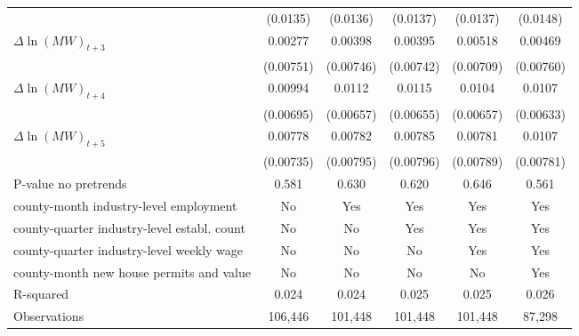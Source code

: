 {\begin{tabular}{l*{5}{c}}
          & (0.0135)         & (0.0136)         & (0.0137)         & (0.0137)         & (0.0148)         \\
[1em]
$\Delta \ln(MW)_{t+3}$&  0.00277         &  0.00398         &  0.00395         &  0.00518         &  0.00469         \\
          &(0.00751)         &(0.00746)         &(0.00742)         &(0.00709)         &(0.00760)         \\
[1em]
$\Delta \ln(MW)_{t+4}$&  0.00994         &   0.0112\sym{*}  &   0.0115\sym{*}  &   0.0104         &   0.0107         \\
          &(0.00695)         &(0.00657)         &(0.00655)         &(0.00657)         &(0.00633)         \\
[1em]
$\Delta \ln(MW)_{t+5}$&  0.00778         &  0.00782         &  0.00785         &  0.00781         &   0.0107         \\
          &(0.00735)         &(0.00795)         &(0.00796)         &(0.00789)         &(0.00781)         \\
\hline
P-value no pretrends&    0.581         &    0.630         &    0.620         &    0.646         &    0.561         \\
county-month industry-level employment&       No         &      Yes         &      Yes         &      Yes         &      Yes         \\
county-quarter industry-level establ. count&       No         &       No         &      Yes         &      Yes         &      Yes         \\
county-quarter industry-level weekly wage&       No         &       No         &       No         &      Yes         &      Yes         \\
county-month new house permits and value&       No         &       No         &       No         &       No         &      Yes         \\
R-squared &    0.024         &    0.024         &    0.025         &    0.025         &    0.026         \\
Observations&  106,446         &  101,448         &  101,448         &  101,448         &   87,298         \\
\hline\hline
\end{tabular}
}
